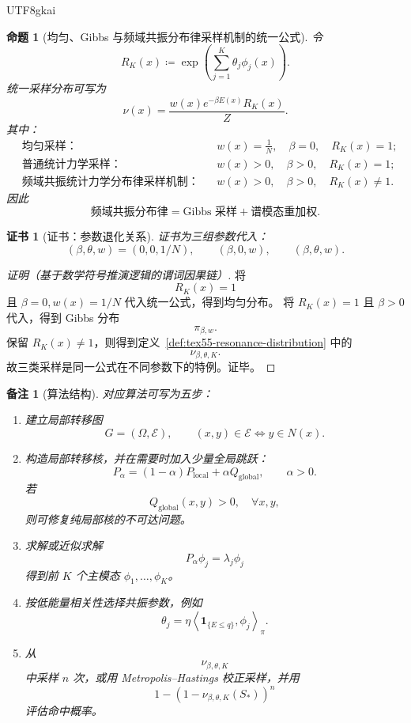 \documentclass[12pt]{article}
\newtheorem{proposition}{命题}[section]
\newtheorem{remark}{备注}[section]
\newtheorem{Certificate}{证书}[section]
\newcommand{\DefEq}{\coloneqq}
\begin{document}
\begin{CJK*}{UTF8}{gkai}
\begin{proposition}[均匀、Gibbs 与频域共振分布律采样机制的统一公式]
\label{prop:tex55-unified-sampling}
令
\[
  R_K(x)
  \DefEq
  \exp\left(\sum_{j=1}^{K}\theta_j\phi_j(x)\right).
\]
统一采样分布可写为
\[
  \nu(x)
  =
  \frac{
  w(x)e^{-\beta E(x)}R_K(x)
  }{
  Z
  }.
\]
其中：
\[
\begin{aligned}
  &\text{均匀采样：}
  &&w(x)=\frac1N,\quad \beta=0,\quad R_K(x)=1;\\
  &\text{普通统计力学采样：}
  &&w(x)>0,\quad \beta>0,\quad R_K(x)=1;\\
  &\text{频域共振统计力学分布律采样机制：}
  &&w(x)>0,\quad \beta>0,\quad R_K(x)\ne1.
\end{aligned}
\]
因此
\[
  \boxed{
  \text{频域共振分布律}
  =
  \text{Gibbs 采样}
  +
  \text{谱模态重加权}
  }.
\]
\end{proposition}

\begin{Certificate}[证书：参数退化关系]
\label{cert:tex55-unified-sampling}
证书为三组参数代入：
\[
  (\beta,\theta,w)
  =
  (0,0,1/N),
  \qquad
  (\beta,0,w),
  \qquad
  (\beta,\theta,w).
\]
\end{Certificate}

\begin{proof}[证明（基于数学符号推演逻辑的谓词因果链）]
将
\[
  R_K(x)=1
\]
且 \(\beta=0,w(x)=1/N\) 代入统一公式，得到均匀分布。
将 \(R_K(x)=1\) 且 \(\beta>0\) 代入，得到 Gibbs 分布
\[
  \pi_{\beta,w}.
\]
保留 \(R_K(x)\ne1\)，则得到定义~\ref{def:tex55-resonance-distribution} 中的
\[
  \nu_{\beta,\theta,K}.
\]
故三类采样是同一公式在不同参数下的特例。证毕。
\end{proof}

\begin{remark}[算法结构]
对应算法可写为五步：
\begin{enumerate}
  \item 建立局部转移图
  \[
    G=(\Omega,\mathcal E),
    \qquad
    (x,y)\in\mathcal E\Longleftrightarrow y\in N(x).
  \]
  \item 构造局部转移核，并在需要时加入少量全局跳跃：
  \[
    P_{\alpha}
    =
    (1-\alpha)P_{\mathrm{local}}
    +
    \alpha Q_{\mathrm{global}},
    \qquad
    \alpha>0.
  \]
  若
  \[
    Q_{\mathrm{global}}(x,y)>0,\quad \forall x,y,
  \]
  则可修复纯局部核的不可达问题。
  \item 求解或近似求解
  \[
    P_{\alpha}\phi_j=\lambda_j\phi_j
  \]
  得到前 \(K\) 个主模态 \(\phi_1,\ldots,\phi_K\)。
  \item 按低能量相关性选择共振参数，例如
  \[
    \theta_j
    =
    \eta
    \left\langle
    \mathbf 1_{\{E\le q\}},
    \phi_j
    \right\rangle_{\pi}.
  \]
  \item 从
  \[
    \nu_{\beta,\theta,K}
  \]
  中采样 \(n\) 次，或用 Metropolis--Hastings 校正采样，并用
  \[
    1-(1-\nu_{\beta,\theta,K}(S_*))^n
  \]
  评估命中概率。
\end{enumerate}
\end{remark}


\end{CJK*}
\end{document}
